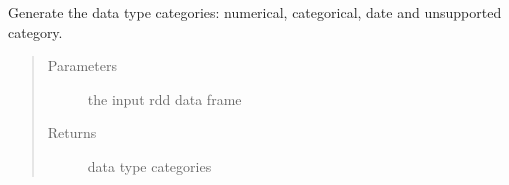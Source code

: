 \documentclass[letterpaper,12pt,english]{sphinxmanual}
\begin{document}
\begin{fulllineitems}
Generate the data type categories: numerical, categorical, date and unsupported category.
\begin{quote}\begin{description}
\item[{Parameters}] \leavevmode
{} \textendash{} the input rdd data frame

\item[{Returns}] \leavevmode
data type categories

\end{description}\end{quote}


\end{fulllineitems}
\end{document}
